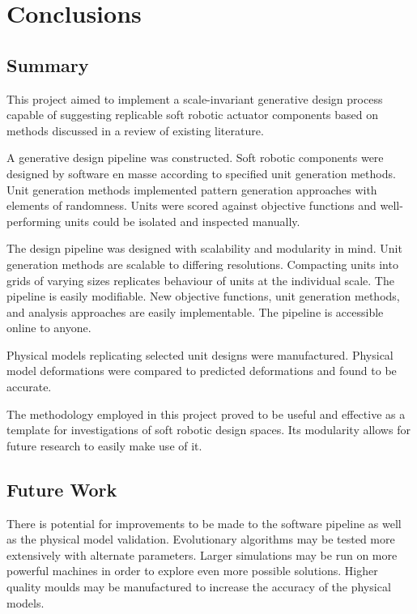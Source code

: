 \chapter{Conclusions}
\label{chp:C}


\section{Summary}

This project aimed to implement a scale-invariant generative design process capable of suggesting replicable soft robotic actuator components based on methods discussed in a review of existing literature.

A generative design pipeline was constructed. Soft robotic components were designed by software en masse according to specified unit generation methods. Unit generation methods implemented pattern generation approaches with elements of randomness. Units were scored against objective functions and well-performing units could be isolated and inspected manually.

The design pipeline was designed with scalability and modularity in mind. Unit generation methods are scalable to differing resolutions. Compacting units into grids of varying sizes replicates behaviour of units at the individual scale. The pipeline is easily modifiable. New objective functions, unit generation methods, and analysis approaches are easily implementable. The pipeline is accessible online to anyone.

Physical models replicating selected unit designs were manufactured. Physical model deformations were compared to predicted deformations and found to be accurate.

The methodology employed in this project proved to be useful and effective as a template for investigations of soft robotic design spaces. Its modularity allows for future research to easily make use of it.

\section{Future Work}

There is potential for improvements to be made to the software pipeline as well as the physical model validation. Evolutionary algorithms may be tested more extensively with alternate parameters. Larger simulations may be run on more powerful machines in order to explore even more possible solutions. Higher quality moulds may be manufactured to increase the accuracy of the physical models.